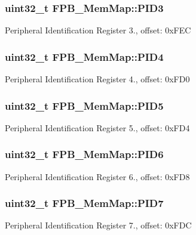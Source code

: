 \subsubsection[{P\+I\+D3}]{\setlength{\rightskip}{0pt plus 5cm}uint32\+\_\+t F\+P\+B\+\_\+\+Mem\+Map\+::\+P\+I\+D3}\label{struct_f_p_b___mem_map_a50469498a2399ab61bfa9c1826a1932a}
Peripheral Identification Register 3., offset\+: 0x\+F\+E\+C \hypertarget{struct_f_p_b___mem_map_a4c24f21441de38f5d96099cf78723401}{}
\subsubsection[{P\+I\+D4}]{\setlength{\rightskip}{0pt plus 5cm}uint32\+\_\+t F\+P\+B\+\_\+\+Mem\+Map\+::\+P\+I\+D4}\label{struct_f_p_b___mem_map_a4c24f21441de38f5d96099cf78723401}
Peripheral Identification Register 4., offset\+: 0x\+F\+D0 \hypertarget{struct_f_p_b___mem_map_a695321526b4704fe0e93fe59e4c88cce}{}
\subsubsection[{P\+I\+D5}]{\setlength{\rightskip}{0pt plus 5cm}uint32\+\_\+t F\+P\+B\+\_\+\+Mem\+Map\+::\+P\+I\+D5}\label{struct_f_p_b___mem_map_a695321526b4704fe0e93fe59e4c88cce}
Peripheral Identification Register 5., offset\+: 0x\+F\+D4 \hypertarget{struct_f_p_b___mem_map_a0b39a99cbc5776452682f777ac30b44e}{}
\subsubsection[{P\+I\+D6}]{\setlength{\rightskip}{0pt plus 5cm}uint32\+\_\+t F\+P\+B\+\_\+\+Mem\+Map\+::\+P\+I\+D6}\label{struct_f_p_b___mem_map_a0b39a99cbc5776452682f777ac30b44e}
Peripheral Identification Register 6., offset\+: 0x\+F\+D8 \hypertarget{struct_f_p_b___mem_map_afa51ab59e5a495de076915024e3e6adf}{}
\subsubsection[{P\+I\+D7}]{\setlength{\rightskip}{0pt plus 5cm}uint32\+\_\+t F\+P\+B\+\_\+\+Mem\+Map\+::\+P\+I\+D7}\label{struct_f_p_b___mem_map_afa51ab59e5a495de076915024e3e6adf}
Peripheral Identification Register 7., offset\+: 0x\+F\+D\+C \hypertarget{struct_f_p_b___mem_map_acdaa312f2de037db4f203b9cfd303772}{}
